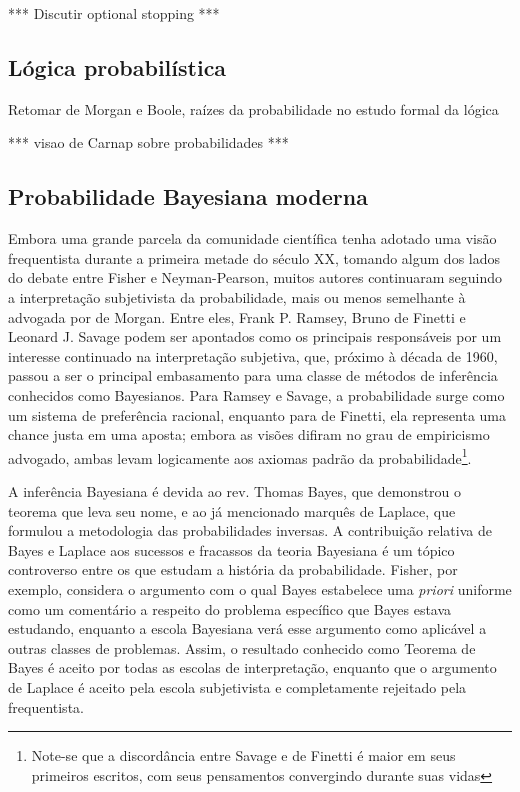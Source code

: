 *** Discutir optional stopping ***
\subsection{Lógica probabilística}

Retomar de Morgan e Boole, raízes da probabilidade no estudo formal da lógica

*** visao de Carnap sobre probabilidades ***
\subsection{Probabilidade Bayesiana moderna}\label{sec:bayes}
Embora uma grande parcela da comunidade científica tenha adotado uma visão frequentista durante a primeira metade do século XX,
tomando algum dos lados do debate entre Fisher e Neyman-Pearson, muitos autores continuaram seguindo a interpretação 
subjetivista da probabilidade, mais ou menos semelhante à advogada por de Morgan. Entre eles, Frank P. Ramsey, 
Bruno de Finetti e Leonard J. Savage
podem ser apontados como os principais responsáveis por um interesse continuado na interpretação subjetiva, que, próximo à
década de 1960, passou a ser o principal embasamento para uma classe de métodos de inferência conhecidos como Bayesianos. 
Para Ramsey e Savage, a probabilidade surge como um sistema de preferência racional, enquanto para de Finetti, ela representa
uma chance justa em uma aposta; embora as visões difiram no grau de empiricismo advogado,
ambas levam logicamente aos axiomas padrão da probabilidade\footnote{Note-se que a discordância entre Savage e de Finetti é
maior em seus primeiros escritos, com seus pensamentos convergindo durante suas vidas}.

A inferência Bayesiana é devida ao rev. Thomas Bayes, que demonstrou o teorema que leva seu nome, e ao já mencionado marquês de
Laplace, que formulou a metodologia das probabilidades inversas. A contribuição relativa de Bayes e Laplace aos sucessos
e fracassos da teoria Bayesiana é um tópico controverso	entre os que estudam a história da probabilidade\cite{Zabell09}.
Fisher, por exemplo, considera o argumento com o qual Bayes estabelece uma {\em priori} uniforme como um comentário
a respeito do problema específico que Bayes estava estudando, enquanto a escola Bayesiana verá esse argumento
como aplicável a outras classes de problemas\cite{Aldrich08}. Assim, o resultado conhecido como Teorema de Bayes é aceito
por todas as escolas de interpretação, enquanto que o argumento de Laplace 
é aceito pela escola subjetivista e completamente rejeitado pela frequentista. 

